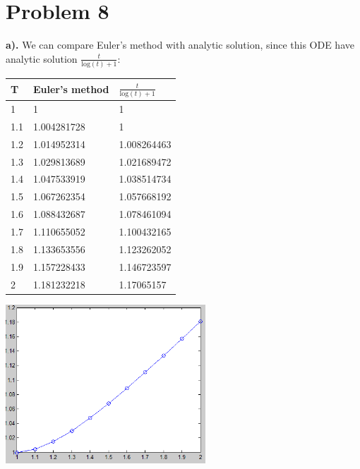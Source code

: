 \documentclass{article}
\begin{document}
\section{Problem 8}
\textbf{a).}
We can compare Euler's method with analytic solution, since this ODE have analytic solution $\frac{t}{\mathrm{log}\!\left(t\right) + 1}$:
\begin{center}\begin{tabular}{lll}
\hline
T &Euler's method & $\frac{t}{\mathrm{log}\!\left(t\right) + 1}$\\\hline
1&1&1\\
\hline
1.1&1.004281728&1\\
\hline
1.2&1.014952314&1.008264463\\
\hline
1.3&1.029813689&1.021689472\\
\hline
1.4&1.047533919&1.038514734\\
\hline
1.5&1.067262354&1.057668192\\
\hline
1.6&1.088432687&1.078461094\\
\hline
1.7&1.110655052&1.100432165\\
\hline
1.8&1.133653556&1.123262052\\
\hline
1.9&1.157228433&1.146723597\\
\hline
2&1.181232218&1.17065157\\
\hline
\end{tabular}\end{center}
\begin{center}
  \includegraphics[width=7.5cm]{../pic/p8_2.png}\\
\end{center}
\end{document}
